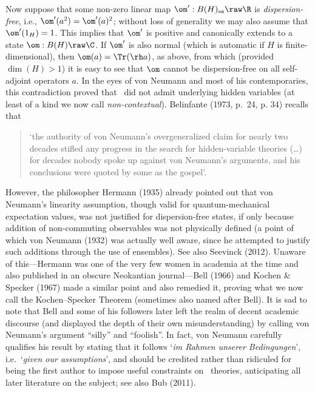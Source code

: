 \documentclass[12pt]{article}
\begin{document}
Now suppose that some non-zero linear map $\om':B(H)_{\mathrm{sa}}\raw\R$ is \emph{dispersion-free}, i.e., $\om'(a^2)=\om'(a)^2$; without loss of generality we may also assume that $\om'(1_H)=1$. 
This implies that $\om'$ is positive and canonically extends to a state $\om:B(H)\raw\C$. If $\om'$ is also normal (which is automatic if $H$ is finite-dimensional), then  $\om(a)=\Tr(\rh a)$, as above, from which (provided $\dim(H)>1$)  it is easy to see that $\om$ cannot be dispersion-free on all self-adjoint operators $a$. In the eyes of von  Neumann and most of his contemporaries, this contradiction proved that \qm\ did not admit underlying hidden variables (at least of a kind we now  call \emph{non-contextual}). Belinfante (1973, p.\ 24, p. 34) recalls that
\begin{quotation}
 `the authority of von Neumann's overgeneralized claim for nearly two decades stifled any progress in the search for hidden-variable theories (\ldots) for decades nobody spoke up against von Neumann's arguments, and his conclusions were quoted by some as the gospel'. 
\end{quotation}
However, the  philosopher Hermann (1935)  already pointed out that von Neumann's linearity assumption, though valid for quantum-mechanical expectation values, was not justified
for dispersion-free states, if only because addition of non-commuting observables was not physically defined (a point of which von Neumann (1932) was actually well aware, since he attempted to justify such additions through the use of ensembles). 
See also Seevinck (2012). Unaware of this---Hermann   was one of the very few women in academia at the time and also published in an obscure Neokantian journal---Bell (1966) and Kochen \& Specker (1967) made a similar point and also remedied it, proving what we now call the Kochen--Specker Theorem (sometimes also named after Bell).
It is sad to note that  Bell and some of his followers later  left the realm of decent academic discourse (and displayed the depth of their own misunderstanding) by calling von Neumann's argument ``silly'' and ``foolish''.
 In  fact,  von Neumann  carefully qualifies his  result by stating that it follows
  `\emph{im Rahmen unserer Bedingungen}', i.e.\ `\emph{given our assumptions}', and 
 should be credited rather than ridiculed for being the first author to impose useful constraints on \hv\ theories, anticipating  all later literature on the subject; see also  Bub (2011).
\end{document}

